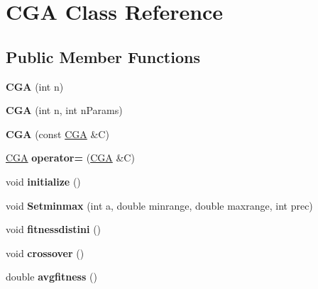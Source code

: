 \hypertarget{class_c_g_a}{}\section{C\+GA Class Reference}
\label{class_c_g_a}
\subsection*{Public Member Functions}
\begin{DoxyCompactItemize}
\item 
\mbox{\label{class_c_g_a_a79885013747532fb7db769e797f3c33d}} 
{\bfseries C\+GA} (int n)
\item 
\mbox{\label{class_c_g_a_afcf871b90dbb6e12652b854d18230508}} 
{\bfseries C\+GA} (int n, int n\+Params)
\item 
\mbox{\label{class_c_g_a_a8eedd8738018802a9a5b92d3584b71aa}} 
{\bfseries C\+GA} (const \hyperlink{class_c_g_a}{C\+GA} \&C)
\item 
\mbox{\label{class_c_g_a_a163fe58393976e190a351d89080a1b06}} 
\hyperlink{class_c_g_a}{C\+GA} {\bfseries operator=} (\hyperlink{class_c_g_a}{C\+GA} \&C)
\item 
\mbox{\label{class_c_g_a_a3476df07e0cc24a687a3b8e42b611ade}} 
void {\bfseries initialize} ()
\item 
\mbox{\label{class_c_g_a_af7041b2cbc1e116818086bbb560fa05b}} 
void {\bfseries Setminmax} (int a, double minrange, double maxrange, int prec)
\item 
\mbox{\label{class_c_g_a_a03ae92e743d1096336d2c1baa190d3b2}} 
void {\bfseries fitnessdistini} ()
\item 
\mbox{\label{class_c_g_a_ab4c289b00e8dfb35ff8c0f58a4d1286f}} 
void {\bfseries crossover} ()
\item 
\mbox{\label{class_c_g_a_a20f77965aff68efc5fd4e98474051556}} 
double {\bfseries avgfitness} ()
\item 
\mbox{\label{class_c_g_a_a1ef34553eaa65cd098e02e53d33db5c4}} 

\end{DoxyCompactItemize}
